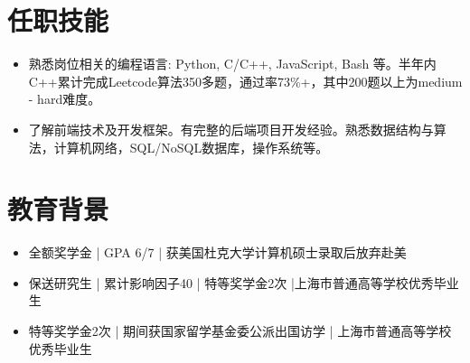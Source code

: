 \documentclass{resume}
\begin{document}


\section{任职技能}
\begin{itemize}
  \item 熟悉岗位相关的编程语言: Python, C/C++, JavaScript, Bash 等。半年内C++累计完成Leetcode算法350多题，通过率73\%+，其中200题以上为medium - hard难度。
  \item 了解前端技术及开发框架。有完整的后端项目开发经验。熟悉数据结构与算法，计算机网络，SQL/NoSQL数据库，操作系统等。
\end{itemize}

\section{教育背景}
\begin{itemize}
\item 全额奖学金 | GPA 6/7 | 获美国杜克大学计算机硕士录取后放弃赴美
\end{itemize}

\begin{itemize}
\item 保送研究生 | 累计影响因子40 | 特等奖学金2次 |上海市普通高等学校优秀毕业生
\end{itemize}

\begin{itemize}
\item 特等奖学金2次 | 期间获国家留学基金委公派出国访学 | 上海市普通高等学校优秀毕业生
\end{itemize}
\end{document}
